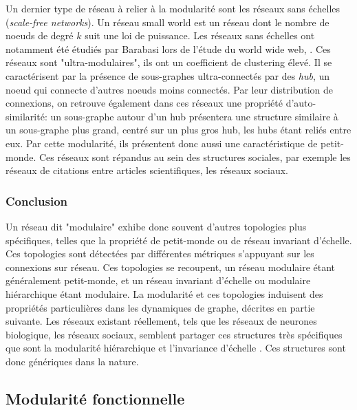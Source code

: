 Un dernier type de réseau à relier à la modularité sont les réseaux sans échelles (\emph{scale-free networks}). Un réseau small world est un réseau dont le nombre de noeuds de degré $k$ suit une loi de puissance. Les réseaux sans échelles ont notamment été étudiés par Barabasi lors de l'étude du world wide web, \cite{Barabasi2003ScaleFreeN}.
Ces réseaux sont "ultra-modulaires", ils ont un coefficient de clustering élevé. Il se caractérisent par la présence de sous-graphes ultra-connectés par des \emph{hub}, un noeud qui connecte d'autres noeuds moins connectés. Par leur distribution de connexions, on retrouve également dans ces réseaux une propriété d'auto-similarité: un sous-graphe autour d'un hub présentera une structure similaire à un sous-graphe plus grand, centré sur un plus gros hub, les hubs étant reliés entre eux. Par cette modularité, ils présentent donc aussi une caractéristique de petit-monde. Ces réseaux sont répandus au sein des structures sociales, par exemple les réseaux de citations entre articles scientifiques, les réseaux sociaux.

\subsubsection{Conclusion}

Un réseau dit "modulaire" exhibe donc souvent d'autres topologies plus spécifiques, telles que la propriété de petit-monde ou de réseau invariant d'échelle. Ces topologies sont détectées par différentes métriques s'appuyant sur les connexions sur réseau. Ces topologies se recoupent, un réseau modulaire étant généralement petit-monde, et un réseau invariant d'échelle ou modulaire hiérarchique étant modulaire. 
La modularité et ces topologies induisent des propriétés particulières dans les dynamiques de graphe, décrites en partie suivante. Les réseaux existant réellement, tels que les réseaux de neurones biologique, les réseaux sociaux, semblent partager ces structures très spécifiques que sont la modularité hiérarchique et l'invariance d'échelle \cite{Harriger2012RichCO, Meunier2010ModularAH, Clauset2008HierarchicalSA, Ravasz2002HierarchicalOO}. Ces structures sont donc génériques dans la nature. 

\subsection{Modularité fonctionnelle}

